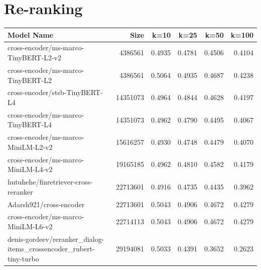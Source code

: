 \section{Re-ranking}

 {\small
  \begin{xltabular}{\textwidth}{X rrrrr}
      \hline
      \textbf{Model Name}                                                    & \textbf{Size} & \textbf{k=10} & \textbf{k=25} & \textbf{k=50} & \textbf{k=100} \\
      \hline
      cross-encoder/ms-marco-TinyBERT-L2-v2                                  & 4386561       & 0.4935        & 0.4781        & 0.4506        & 0.4104         \\
      cross-encoder/ms-marco-TinyBERT-L2                                     & 4386561       & 0.5064        & 0.4935        & 0.4687        & 0.4238         \\
      cross-encoder/stsb-TinyBERT-L4                                         & 14351073      & 0.4964        & 0.4844        & 0.4628        & 0.4197         \\
      cross-encoder/ms-marco-TinyBERT-L4                                     & 14351073      & 0.4962        & 0.4790        & 0.4495        & 0.4067         \\
      cross-encoder/ms-marco-MiniLM-L2-v2                                    & 15616257      & 0.4930        & 0.4748        & 0.4479        & 0.4070         \\
      cross-encoder/ms-marco-MiniLM-L4-v2                                    & 19165185      & 0.4962        & 0.4810        & 0.4582        & 0.4179         \\
      hutuhehe/finretriever-cross-reranker                                   & 22713601      & 0.4916        & 0.4735        & 0.4435        & 0.3962         \\
      Adarsh921/cross-encoder                                                & 22713601      & 0.5043        & 0.4906        & 0.4672        & 0.4279         \\
      cross-encoder/ms-marco-MiniLM-L6-v2                                    & 22714113      & 0.5043        & 0.4906        & 0.4672        & 0.4279         \\
      denis-gordeev/reranker\_dialog-items\_crossencoder\_rubert-tiny-turbo & 29194081      & 0.5033        & 0.4391        & 0.3652        & 0.2623         \\

\end{xltabular}}
